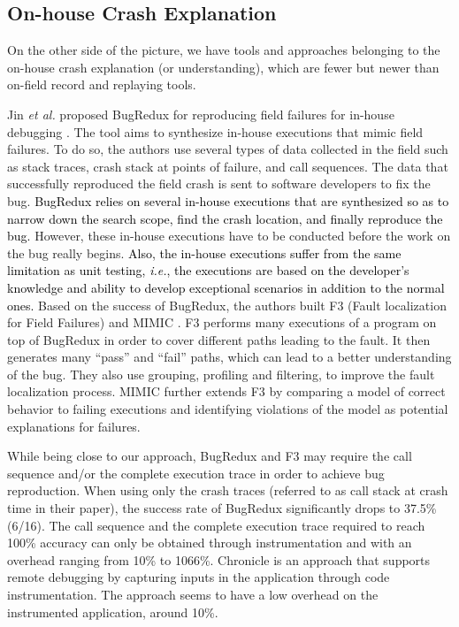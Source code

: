 \documentclass[times, doublespace]{smrauth}
\newcommand{\red}[1]{\textcolor{black}{#1}}
\begin{document}
\subsection{On-house Crash Explanation}

On the other side of the picture, we have tools and approaches belonging to the on-house crash explanation  (or understanding), which are fewer but newer than on-field record and replaying tools.

Jin {\it et al.} proposed BugRedux for reproducing field failures for in-house debugging \cite{Jin2012}.
The tool aims to synthesize in-house executions that mimic field failures.
To do so, the authors use several types of data collected in the field such as stack traces, crash stack at points of failure, and call sequences.
The data that successfully reproduced the field crash is sent to software developers to fix the bug.
\red{BugRedux relies on several in-house executions that are synthesized so as to narrow down the search scope,  find the crash location, and finally reproduce the bug.}
However, these in-house executions have to be conducted before the work on the bug really begins.
\red{Also, the in-house executions suffer from the same limitation as unit testing, {\it i.e.}, the executions are based on the developer's knowledge and ability to develop exceptional scenarios in addition to the normal ones.}
Based on the success of BugRedux, the authors built F3 (Fault
localization for Field Failures) \cite{Jin2013} and MIMIC \cite{Zuddas2014}. F3 performs many
executions of a program on top of BugRedux in order to cover
different paths leading to the fault.
 It then generates many
``pass'' and ``fail'' paths, which can lead to a better understanding
of the bug. They also use grouping, profiling and filtering, to
improve the fault localization process. MIMIC further extends F3 by comparing a model of correct behavior to failing executions and identifying violations of the model as potential explanations for
failures.

While being close to our approach, BugRedux and F3 may require the call sequence and/or the complete execution trace in order to achieve bug reproduction. When using only the crash traces (referred to as call stack at crash time in their paper), the success rate of BugRedux significantly drops to 37.5\% (6/16). The call sequence and the complete execution trace required to reach 100\% accuracy can only be obtained through instrumentation and with an overhead ranging from 10\% to 1066\%. Chronicle \cite{Bell2013} is an approach that supports remote debugging by capturing inputs in the application through code instrumentation.
The approach seems to have a low overhead on the instrumented application, around 10\%.
\end{document}
